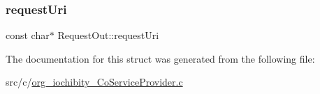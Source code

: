 \hypertarget{struct_request_out_a1c7a4613c9332658740ca98f33313ff3}{}\label{struct_request_out_a1c7a4613c9332658740ca98f33313ff3} 
\subsubsection{\texorpdfstring{request\+Uri}{requestUri}}
{\footnotesize\ttfamily const char$\ast$ Request\+Out\+::request\+Uri}



The documentation for this struct was generated from the following file\+:\begin{DoxyCompactItemize}
\item 
src/c/\hyperlink{org__iochibity___co_service_provider_8c}{org\+\_\+iochibity\+\_\+\+Co\+Service\+Provider.\+c}\end{DoxyCompactItemize}
